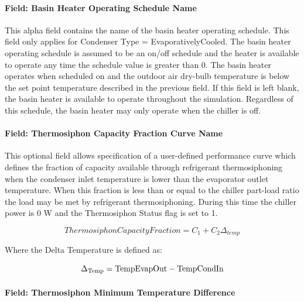 \paragraph{Field: Basin Heater Operating Schedule Name}\label{field-basin-heater-operating-schedule-name-002}

This alpha field contains the name of the basin heater operating schedule. This field only applies for Condenser Type = EvaporativelyCooled. The basin heater operating schedule is assumed to be an on/off schedule and the heater is available to operate any time the schedule value is greater than 0. The basin heater operates when scheduled on and the outdoor air dry-bulb temperature is below the set point temperature described in the previous field. If this field is left blank, the basin heater is available to operate throughout the simulation. Regardless of this schedule, the basin heater may only operate when the chiller is off.

\paragraph{Field: Thermosiphon Capacity Fraction Curve Name}\label{thermosiphon-capacity-fraction-curve-name1}

This optional field allows specification of a user-defined performance curve which defines the fraction of capacity available through refrigerant thermosiphoning when the condenser inlet temperature is lower than the evaporator outlet temperature. When this fraction is less than or equal to the chiller part-load ratio the load may be met by refrigerant thermosiphoning. During this time the chiller power is 0 W and the Thermosiphon Status flag is set to 1.

\begin{equation}
    ThermosiphonCapacityFraction = {C_1} + {C_2}{\Delta_{temp}}
\end{equation}

Where the Delta Temperature is defined as:

\begin{equation}
{\Delta_{{\rm{Temp}}}}
    = {\rm{TempEvapOut  -  TempCondIn }}
\end{equation}

\paragraph{Field: Thermosiphon Minimum Temperature Difference}\label{thermosiphon-minimum-temperature-difference1}

